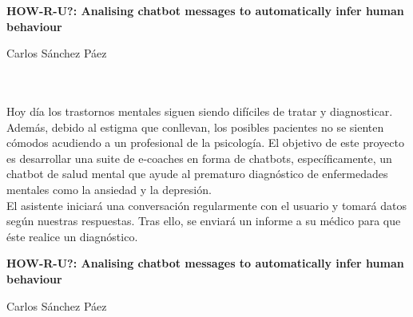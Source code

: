 
\cleardoublepage
\thispagestyle{empty}

\begin{center}
{\large\bfseries HOW-R-U?: Analising chatbot messages to automatically infer human behaviour}\\
\end{center}
\begin{center}
Carlos Sánchez Páez\\
\end{center}

\\

\vspace{0.7cm}
\\

Hoy día los trastornos mentales siguen siendo difíciles de tratar y diagnosticar. Además, debido al estigma que conllevan, los posibles pacientes
no se sienten cómodos acudiendo a un profesional de la psicología. El objetivo de este proyecto es desarrollar una suite de e-coaches en forma de
chatbots, específicamente, un chatbot de salud mental que ayude al prematuro diagnóstico de enfermedades mentales como la ansiedad y la depresión.\\

El asistente iniciará una conversación regularmente con el usuario y tomará datos según nuestras respuestas. Tras ello, se enviará un informe a su
médico para que éste realice un diagnóstico.
\cleardoublepage


\thispagestyle{empty}


\begin{center}
{\large\bfseries HOW-R-U?: Analising chatbot messages to automatically infer human behaviour}\\
\end{center}
\begin{center}
Carlos Sánchez Páez\\
\end{center}

\\

\vspace{0.7cm}
\\

